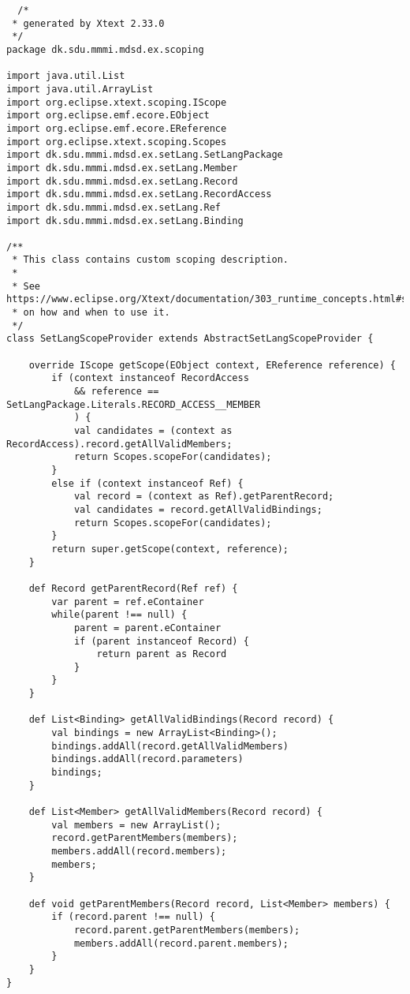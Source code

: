 \documentclass[12pt]{article}
\begin{document}
\begin{verbatim}
  /*
 * generated by Xtext 2.33.0
 */
package dk.sdu.mmmi.mdsd.ex.scoping

import java.util.List
import java.util.ArrayList
import org.eclipse.xtext.scoping.IScope
import org.eclipse.emf.ecore.EObject
import org.eclipse.emf.ecore.EReference
import org.eclipse.xtext.scoping.Scopes
import dk.sdu.mmmi.mdsd.ex.setLang.SetLangPackage
import dk.sdu.mmmi.mdsd.ex.setLang.Member
import dk.sdu.mmmi.mdsd.ex.setLang.Record
import dk.sdu.mmmi.mdsd.ex.setLang.RecordAccess
import dk.sdu.mmmi.mdsd.ex.setLang.Ref
import dk.sdu.mmmi.mdsd.ex.setLang.Binding

/**
 * This class contains custom scoping description.
 * 
 * See https://www.eclipse.org/Xtext/documentation/303_runtime_concepts.html#scoping
 * on how and when to use it.
 */
class SetLangScopeProvider extends AbstractSetLangScopeProvider {
	
	override IScope getScope(EObject context, EReference reference) {
	    if (context instanceof RecordAccess 
	    	&& reference == SetLangPackage.Literals.RECORD_ACCESS__MEMBER
	    	) {
	        val candidates = (context as RecordAccess).record.getAllValidMembers;	        
	        return Scopes.scopeFor(candidates);
	    }
	    else if (context instanceof Ref) {
	    	val record = (context as Ref).getParentRecord;
	        val candidates = record.getAllValidBindings;
         	return Scopes.scopeFor(candidates);
	    }
        return super.getScope(context, reference);
	}
	
	def Record getParentRecord(Ref ref) {
		var parent = ref.eContainer
		while(parent !== null) {
			parent = parent.eContainer
			if (parent instanceof Record) {
				return parent as Record
			}
		}
	}
	
	def List<Binding> getAllValidBindings(Record record) {
		val bindings = new ArrayList<Binding>();
		bindings.addAll(record.getAllValidMembers)
		bindings.addAll(record.parameters)
		bindings;
	}
	
	def List<Member> getAllValidMembers(Record record) {
		val members = new ArrayList();
		record.getParentMembers(members);
		members.addAll(record.members);
		members;
	}
	
	def void getParentMembers(Record record, List<Member> members) {
		if (record.parent !== null) {
			record.parent.getParentMembers(members);
			members.addAll(record.parent.members);
		}
	}
}

\end{verbatim}
\end{document}
